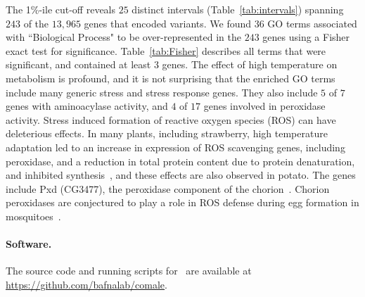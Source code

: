 \documentclass[11pt]{article}
\def\comale{\text{{\sc Comale}}}
\begin{document}
The 1\%-ile cut-off reveals $25$ distinct intervals 
(Table~\ref{tab:intervals})  spanning $243$ of 
the $13,965$ genes that encoded
variants. We found $36$ GO terms associated with ``Biological Process" to be 
over-represented in the $243$ genes using a Fisher exact
test for significance. Table~\ref{tab:Fisher} describes all terms that
were significant, and contained at least $3$ genes. The
effect of high temperature on metabolism is profound, and it is not
surprising that the enriched GO terms include many generic stress and
stress response genes. They also include $5$ of $7$ genes with
aminoacylase activity, and $4$ of $17$ genes involved in peroxidase
activity. Stress induced formation of reactive oxygen species (ROS)
can have deleterious effects. In many plants, including strawberry,
high temperature adaptation led to an increase in expression of ROS
scavenging genes, including peroxidase, and a reduction in total
protein content due to protein denaturation, and inhibited
synthesis~\cite{gulen2004effect}, and these effects are also observed in
potato. The genes include Pxd (CG3477), the peroxidase component of the
chorion~\cite{konstandi2005enzymatic}. Chorion peroxidases are conjectured
to play a role in ROS defense during egg formation in 
mosquitoes~\cite{li2006major}. 

\paragraph{Software.}
The source code and running scripts for \comale\ are available at \\
\href{https://github.com/bafnalab/comale}{https://github.com/bafnalab/comale}.
\end{document}
